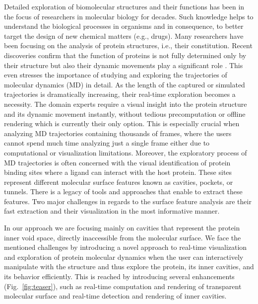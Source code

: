 
Detailed exploration of biomolecular structures and their functions has been in the focus of researchers in molecular biology for decades.
Such knowledge helps to understand the biological processes in organisms and in consequence, to better target the design of new chemical matters (e.g., drugs).
Many researchers have been focusing on the analysis of protein structures, i.e., their constitution. 
Recent discoveries confirm that the function of proteins is not fully determined only by their structure but also their dynamic movements play a significant role \cite{Hensen2012}.
This even stresses the importance of studying and exploring the trajectories of molecular dynamics (MD) in detail. 
As the length of the captured or simulated trajectories is dramatically increasing, their real-time exploration becomes a necessity. 
The domain experts require a visual insight into the protein structure and its dynamic movement instantly, without tedious precomputation or offline rendering which is currently their only option.
This is especially crucial when analyzing MD trajectories containing thousands of frames, where the users cannot spend much time analyzing just a single frame either due to computational or visualization limitations. 
Moreover, the exploratory process of MD trajectories is often concerned with the visual identification of protein binding sites where a ligand can interact with the host protein.
These sites represent different molecular surface features known as cavities, pockets, or tunnels.
There is a legacy of tools and approaches that enable to extract these features.
Two major challenges in regards to the surface feature analysis are their fast extraction and their visualization in the most informative manner. 

In our approach we are focusing mainly on cavities that represent the protein inner void space, directly inaccessible from the molecular surface. 
We face the mentioned challenges by introducing a novel approach to real-time visualization and exploration of protein molecular dynamics when the user can interactively manipulate with the structure and thus explore the protein, its inner cavities, and its behavior efficiently. 
This is reached by introducing several enhancements (Fig.~\ref{fig:teaser}), such as real-time computation and rendering of transparent molecular surface and real-time detection and rendering of inner cavities.


